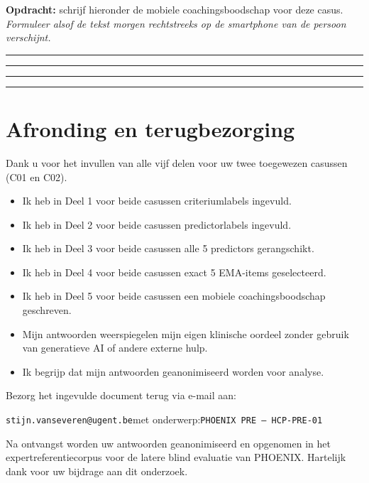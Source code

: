 \documentclass[11pt,a4paper]{article}
\newcommand{\writeline}{\vspace{0.22em}\noindent\rule{\linewidth}{0.25pt}\vspace{0.42em}\par}
\newcommand{\messagelines}{\writeline\writeline\writeline\writeline}
\begin{document}
\begin{responsebox}
\small\textbf{Opdracht:} schrijf hieronder de mobiele coachingsboodschap voor deze casus.
\textit{Formuleer alsof de tekst morgen rechtstreeks op de smartphone van de persoon verschijnt.}

\messagelines
\end{responsebox}

\vspace{0.6em}
\newpage


\section{Afronding en terugbezorging}

Dank u voor het invullen van alle vijf delen voor uw twee toegewezen casussen
(C01 en C02).

\begin{instrbox}[title=Checklist voor terugbezorging]
\begin{itemize}
\item[$\square$] Ik heb in Deel 1 voor beide casussen criteriumlabels ingevuld.
\item[$\square$] Ik heb in Deel 2 voor beide casussen predictorlabels ingevuld.
\item[$\square$] Ik heb in Deel 3 voor beide casussen alle 5 predictors gerangschikt.
\item[$\square$] Ik heb in Deel 4 voor beide casussen exact 5 EMA-items geselecteerd.
\item[$\square$] Ik heb in Deel 5 voor beide casussen een mobiele coachingsboodschap geschreven.
\item[$\square$] Mijn antwoorden weerspiegelen mijn eigen klinische oordeel zonder gebruik van generatieve AI of andere externe hulp.
\item[$\square$] Ik begrijp dat mijn antwoorden geanonimiseerd worden voor analyse.
\end{itemize}
\end{instrbox}

\medskip
Bezorg het ingevulde document terug via e-mail aan:
\begin{center}
\texttt{stijn.vanseveren@ugent.be}\quad met onderwerp:\quad \texttt{PHOENIX PRE --- HCP-PRE-01}
\end{center}

\vspace{0.5em}
\begin{tcolorbox}[colback=AccentBlue,colframe=PrimaryBlue,arc=2mm,boxrule=0.6pt,left=8pt,right=8pt,top=7pt,bottom=7pt]
\small\centering
Na ontvangst worden uw antwoorden geanonimiseerd en opgenomen in het expertreferentiecorpus
voor de latere blind evaluatie van PHOENIX. Hartelijk dank voor uw bijdrage aan dit onderzoek.
\end{tcolorbox}
\end{document}
